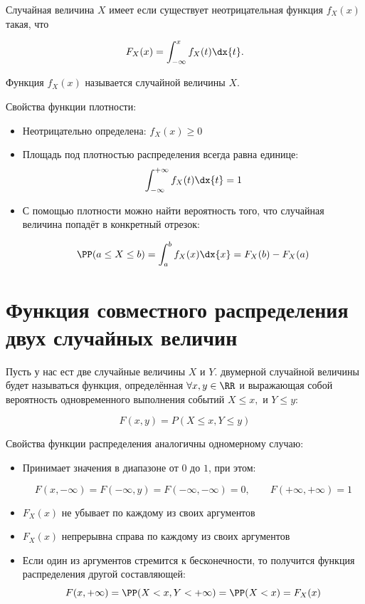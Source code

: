 \documentclass[12pt, a4paper, oneside]{article}
\begin{document}
Случайная величина $X$ имеет  если существует неотрицательная функция $f_X(x)$ такая, что 

$$ 
F_X(x) =\int_{-\infty}^{x} f_X(t) \dx{t}.
$$

Функция $f_X(x)$ называется  случайной величины $X$.

Свойства функции плотности:

\begin{itemize}
\item Неотрицательно определена: $ f_X(x) \geq 0$

\item Площадь под плотностью распределения всегда равна единице: $$\int_{-\infty}^{+\infty} f_X(t)  \dx{t} = 1$$

\item С помощью плотности можно найти вероятность того, что случайная величина попадёт в конкретный отрезок: 

$$
\PP(a \le X \le b) = \int_a^b f_X(x) \dx{x} = F_X(b) - F_X(a)
$$
\end{itemize}


\section{Функция совместного распределения двух случайных величин}

Пусть у нас ест две случайные величины $X$ и $Y$.   двумерной случайной величины будет называться функция, определённая  $ \forall x,y \in \RR$ и выражающая собой вероятность одновременного выполнения событий $X \leq x,$ и $Y \leq y$:

$$
F(x,y) = P(X \leq x, Y \leq y)
$$

Свойства функции распределения аналогичны одномерному случаю: 

\begin{itemize}
	\item Принимает значения в диапазоне от $0$ до $1$, при этом:  
	
	$$
	F(x, -\infty) = F(-\infty, y) = F(-\infty, -\infty) = 0, \qquad  F(+\infty,+\infty) = 1
	$$
	
	\item $F_X(x)$ не убывает по каждому из своих аргументов
	
	\item $F_X(x)$ непрерывна справа по каждому из своих аргументов 
	
	\item Если один из аргументов стремится к бесконечности, то получится функция распределения другой составляющей: $$ F(x,+\infty)  = \PP(X< x, Y < +\infty) = \PP(X< x) = F_X(x) $$
\end{itemize}
\end{document}
